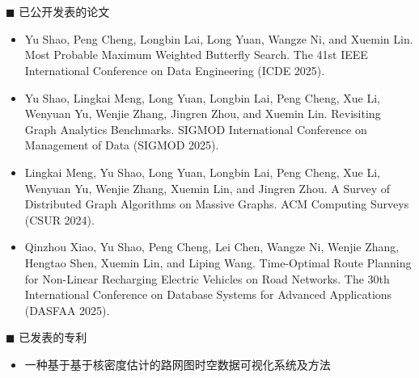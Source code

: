 \chapter*{}
\vskip 5mm

  {\heiti $\blacksquare$ 已公开发表的论文}\vskip 5mm

\begin{itemize}
  \item 
  Yu Shao, Peng Cheng, Longbin Lai, Long Yuan, Wangze Ni, and Xuemin Lin. Most Probable Maximum Weighted Butterfly Search. The 41st IEEE International Conference on Data Engineering (ICDE 2025).

  \item 
  Yu Shao, Lingkai Meng, Long Yuan, Longbin Lai, Peng Cheng, Xue Li, Wenyuan Yu, Wenjie Zhang, Jingren Zhou, and Xuemin Lin. Revisiting Graph Analytics Benchmarks. SIGMOD International Conference on Management of Data (SIGMOD 2025).

  \item 
  Lingkai Meng, Yu Shao, Long Yuan, Longbin Lai, Peng Cheng, Xue Li, Wenyuan Yu, Wenjie Zhang, Xuemin Lin, and Jingren Zhou. A Survey of Distributed Graph Algorithms on Massive Graphs. ACM Computing Surveys (CSUR 2024).

  \item 
  Qinzhou Xiao, Yu Shao, Peng Cheng, Lei Chen, Wangze Ni, Wenjie Zhang, Hengtao Shen, Xuemin Lin, and Liping Wang. Time-Optimal Route Planning for Non-Linear Recharging Electric Vehicles on Road Networks. The 30th International Conference on Database Systems for Advanced Applications (DASFAA 2025).
\end{itemize}

\bigskip\bigskip

{\heiti $\blacksquare$ 已发表的专利}\vskip 5mm

\begin{itemize}
  \item 一种基于基于核密度估计的路网图时空数据可视化系统及方法
\end{itemize}
